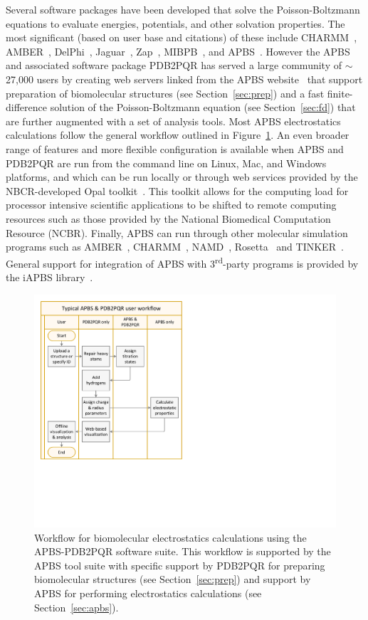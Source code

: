 \documentclass[12pt,titlepage]{article}
\begin{document}
Several software packages have been developed that solve the Poisson-Boltzmann equations to evaluate energies, potentials, and other solvation properties.
The most significant (based on user base and citations) of these include CHARMM~\cite{Brooks2009}, AMBER~\cite{Case2005}, DelPhi~\cite{Sarkar2013}, Jaguar~\cite{Bochevarov2013}, Zap~\cite{Grant2001}, MIBPB~\cite{Zhou2008}, and APBS~\cite{Baker2001a}.
However the APBS and associated software package PDB2PQR has served a large community of $\sim$27,000 users by creating web servers linked from the APBS website~\cite{APBSweb} that support preparation of biomolecular structures (see Section~\ref{sec:prep}) and a fast finite-difference solution of the Poisson-Boltzmann equation (see Section~\ref{sec:fd}) that are further augmented with a set of analysis tools.
Most APBS electrostatics calculations follow the general workflow outlined in Figure~\ref{fig:PDB2PQR-APBS}.
An even broader range of features and more flexible configuration is available when APBS and PDB2PQR are run from the command line on Linux, Mac, and Windows platforms, and which can be run locally or through web services provided by the NBCR-developed Opal toolkit~\cite{Krishnan2009}.
This toolkit allows for the computing load for processor intensive scientific applications to be shifted to remote computing resources such as those provided by the National Biomedical Computation Resource (NCBR).
Finally, APBS can run through other molecular simulation programs such as AMBER~\cite{Case2005}, CHARMM~\cite{Brooks2009}, NAMD~\cite{Phillips2005}, Rosetta~\cite{Rosetta} and TINKER~\cite{TINKER}.
General support for integration of APBS with 3\textsuperscript{rd}-party programs is provided by the iAPBS library~\cite{Konecny2012, iAPBSweb}.
\begin{figure}
	\centering
	\includegraphics[width=0.60\linewidth]{APBS-and-PDB2PQR-user-flow} 
	\caption{Workflow for biomolecular electrostatics calculations using the APBS-PDB2PQR software suite. This workflow is supported by the APBS tool suite with specific support by PDB2PQR for preparing biomolecular structures (see Section~\ref{sec:prep}) and support by APBS for performing electrostatics calculations (see Section~\ref{sec:apbs}).}
	\label{fig:PDB2PQR-APBS}
\end{figure}
\end{document}
